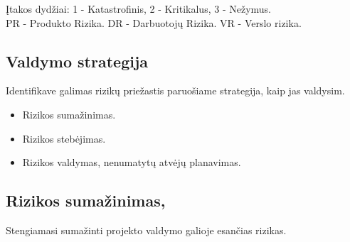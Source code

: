 \documentclass[a4paper,12pt]{article}
\begin{document}
\k Itakos dydžiai: 
		1 - Katastrofinis,
		2 - Kritikalus,
		3 - Ne\v zymus.\\
		PR - Produkto Rizika. DR - Darbuotoj\k u Rizika. VR - Verslo rizika. \\
	
\subsection{Valdymo strategija}
Identifikave galimas rizik\k u prie\v zastis paruo\v siame strategija, kaip jas valdysim.
\begin{itemize}
  \item Rizikos suma\v zinimas.
  \item Rizikos steb\. ejimas.
  \item Rizikos valdymas, nenumatyt\k u atv\. ej\k u planavimas.
\end{itemize}

\newpage

\subsection{Rizikos suma\v zinimas, }
Stengiamasi suma\v zinti projekto valdymo galioje esan\v cias rizikas.
\end{document}
